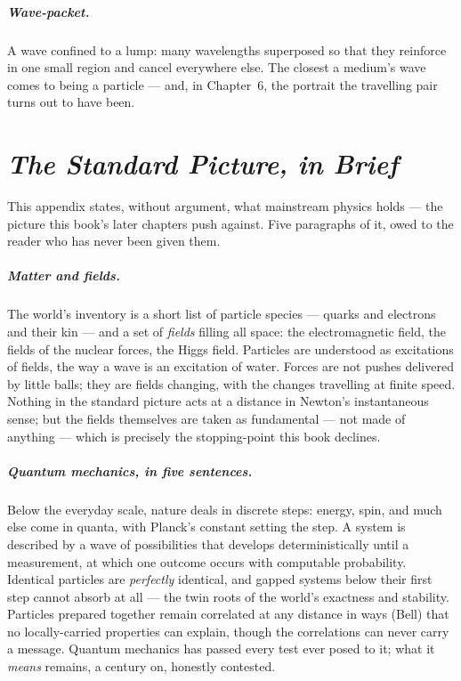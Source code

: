 \documentclass[fontsize=11pt,paper=a4,pagesize=auto,parskip=half-]{scrbook}
\begin{document}
\paragraph{Wave-packet.} A wave confined to a lump: many wavelengths superposed so that they reinforce in one small region and cancel everywhere else. The closest a medium's wave comes to being a particle --- and, in Chapter~6, the portrait the travelling pair turns out to have been.

\chapter{\emph{The Standard Picture, in Brief}}

This appendix states, without argument, what mainstream physics holds --- the picture this book's later chapters push against. Five paragraphs of it, owed to the reader who has never been given them.

\paragraph{Matter and fields.} The world's inventory is a short list of particle species --- quarks and electrons and their kin --- and a set of \emph{fields} filling all space: the electromagnetic field, the fields of the nuclear forces, the Higgs field. Particles are understood as excitations of fields, the way a wave is an excitation of water. Forces are not pushes delivered by little balls; they are fields changing, with the changes travelling at finite speed. Nothing in the standard picture acts at a distance in Newton's instantaneous sense; but the fields themselves are taken as fundamental --- not made of anything --- which is precisely the stopping-point this book declines.

\paragraph{Quantum mechanics, in five sentences.} Below the everyday scale, nature deals in discrete steps: energy, spin, and much else come in quanta, with Planck's constant setting the step. A system is described by a wave of possibilities that develops deterministically until a measurement, at which one outcome occurs with computable probability. Identical particles are \emph{perfectly} identical, and gapped systems below their first step cannot absorb at all --- the twin roots of the world's exactness and stability. Particles prepared together remain correlated at any distance in ways (Bell) that no locally-carried properties can explain, though the correlations can never carry a message. Quantum mechanics has passed every test ever posed to it; what it \emph{means} remains, a century on, honestly contested.
\end{document}
